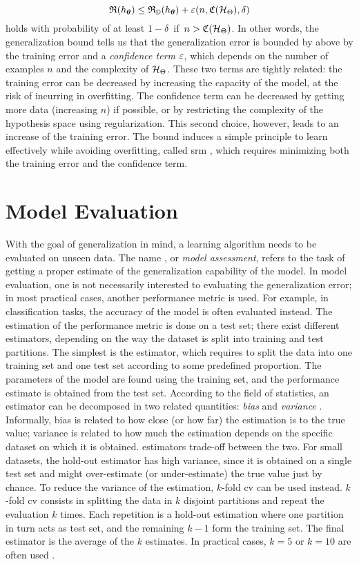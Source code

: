 $$\Risk(h_{\Param}) \leq \Risk_{\Data}(h_{\Param}) + \eps(n, \Complexity(\HSpace), \delta)$$
holds with probability of at least $1 - \delta\,$ if $\,n > \Complexity(\HSpace)$. In other words, the generalization bound tells us that the generalization error is bounded by above by the training error and a \emph{confidence term} $\varepsilon$, which depends on the number of examples $n$ and the complexity of $\HSpace$. These two terms are tightly related: the training error can be decreased by increasing the capacity of the model, at the risk of incurring in overfitting. The confidence term can be decreased by getting more data (increasing $n$) if possible, or by restricting the complexity of the hypothesis space using regularization. This second choice, however, leads to an increase of the training error. The bound induces a simple principle to learn effectively while avoiding overfitting, called \gls{srm} \citep{vapnik2000slt}, which requires minimizing both the training error and the confidence term.

\section{Model Evaluation}\label{sec:model-selection}
With the goal of generalization in mind, a learning algorithm needs to be evaluated on unseen data. The name , or \emph{model assessment}, refers to the task of getting a proper estimate of the generalization capability of the model. In model evaluation, one is not necessarily interested to evaluating the generalization error; in most practical cases, another performance metric is used. For example, in classification tasks, the accuracy of the model is often evaluated instead. The estimation of the performance metric is done on a test set; there exist different estimators, depending on the way the dataset is split into training and test partitions. The simplest is the  estimator, which requires to split the data into one training set and one test set according to some predefined proportion. The parameters of the model are found using the training set, and the performance estimate is obtained from the test set. According to the field of statistics, an estimator can be decomposed in two related quantities: \emph{bias} and \emph{variance} \citep{hastie2009elements}. Informally, bias is related to how close (or how far) the estimation is to the true value; variance is related to how much the estimation depends on the specific dataset on which it is obtained.  estimators trade-off between the two. For small datasets, the hold-out estimator has high variance, since it is obtained on a single test set and might over-estimate (or under-estimate) the true value just by chance. To reduce the variance of the estimation, $k$-fold \gls{cv} \citep{arlot2010cv} can be used instead. $k$-fold \gls{cv} consists in splitting the data in $k$ disjoint partitions and repeat the evaluation $k$ times. Each repetition is a hold-out estimation where one partition in turn acts as test set, and the remaining $k-1$ form the training set. The final estimator is the average of the $k$ estimates. In practical cases, $k=5$ or $k=10$ are often used \citep{hastie2009elements,kohavi1995kfold}.

